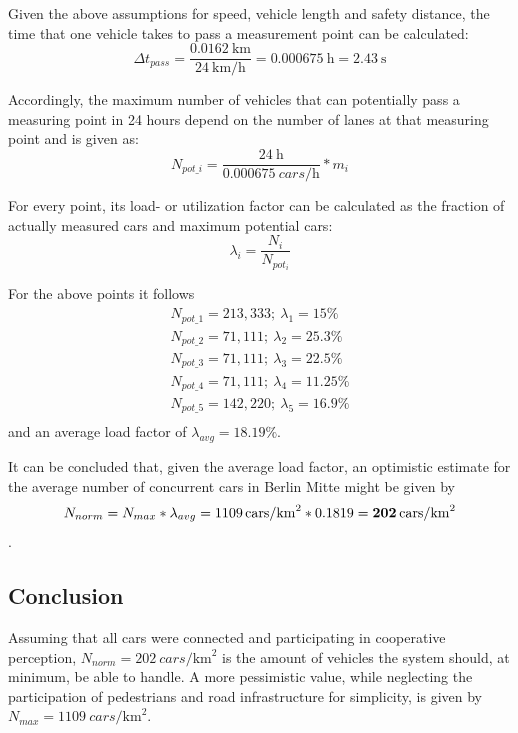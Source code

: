 Given the above assumptions for speed, vehicle length and safety distance, the time that one vehicle takes to pass a measurement point can be calculated: $$\Delta t_{pass} = \frac{\SI{0.0162}{\km}}{\SI{24}{\km\per\hour}} = \SI{0.000675}{\hour} = \SI{2.43}{\second}$$

Accordingly, the maximum number of vehicles that can potentially pass a measuring point in 24 hours depend on the number of lanes at that measuring point and is given as: $$N_{pot\_i} = \frac{\SI{24}{\hour}}{\SI{0.000675}{cars\per\hour}} * m_i$$

For every point, its load- or utilization factor can be calculated as the fraction of actually measured cars and maximum potential cars: $$\lambda_i = \frac{N_i}{N_{pot_i}}$$

For the above points it follows
\begin{gather*}
N_{pot\_1} = 213,333; \  \lambda_1 = 15 \% \\
N_{pot\_2} = 71,111; \  \lambda_2 = 25.3 \% \\
N_{pot\_3} = 71,111; \  \lambda_3 = 22.5 \% \\
N_{pot\_4} = 71,111; \  \lambda_4 = 11.25 \% \\
N_{pot\_5} = 142,220; \  \lambda_5 = 16.9 \% \\
\end{gather*}
and an average load factor of $\lambda_{avg} = 18.19 \%$.

It can be concluded that, given the average load factor, an optimistic estimate for the average number of concurrent cars in Berlin Mitte might be given by $$N_{norm} = N_{max} * \lambda_{avg} = \SI[detect-weight]{1109}{cars\per\square\km} * 0.1819 = \textbf{\SI[detect-weight]{202}{cars\per\square\km}}$$.

\subsection{Conclusion}
\label{subsec:problem_analysis:conclusion}
Assuming that all cars were connected and participating in cooperative perception, \textbf{$N_{norm} = \SI[detect-weight]{202}{cars\per\square\km}$} is the amount of vehicles the system should, at minimum, be able to handle. A more pessimistic value, while neglecting the participation of pedestrians and road infrastructure for simplicity, is given by \textbf{$N_{max} = \SI[detect-weight]{1109}{cars\per\square\km}$}.